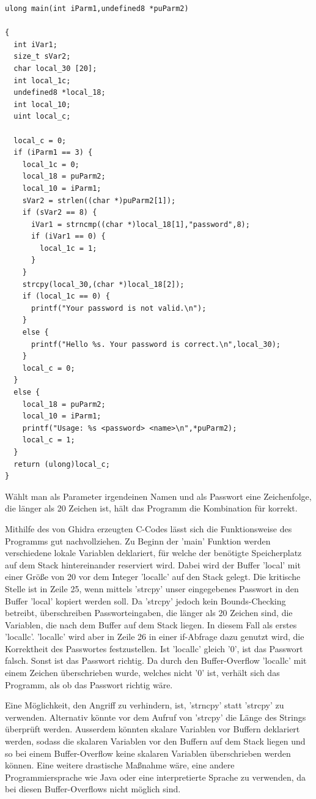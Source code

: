 \documentclass[12pt,a4paper]{article}
\begin{document}
\begin{lstlisting}[style=CStyle]
ulong main(int iParm1,undefined8 *puParm2)

{
  int iVar1;
  size_t sVar2;
  char local_30 [20];
  int local_1c;
  undefined8 *local_18;
  int local_10;
  uint local_c;
  
  local_c = 0;
  if (iParm1 == 3) {
    local_1c = 0;
    local_18 = puParm2;
    local_10 = iParm1;
    sVar2 = strlen((char *)puParm2[1]);
    if (sVar2 == 8) {
      iVar1 = strncmp((char *)local_18[1],"password",8);
      if (iVar1 == 0) {
        local_1c = 1;
      }
    }
    strcpy(local_30,(char *)local_18[2]);
    if (local_1c == 0) {
      printf("Your password is not valid.\n");
    }
    else {
      printf("Hello %s. Your password is correct.\n",local_30);
    }
    local_c = 0;
  }
  else {
    local_18 = puParm2;
    local_10 = iParm1;
    printf("Usage: %s <password> <name>\n",*puParm2);
    local_c = 1;
  }
  return (ulong)local_c;
}
\end{lstlisting}
\bigskip

Wählt man als Parameter irgendeinen Namen und als Passwort eine Zeichenfolge, die länger als 20
Zeichen ist, hält das Programm die Kombination für korrekt.
\bigskip

Mithilfe des von Ghidra erzeugten C-Codes lässt sich die Funktionsweise des Programms gut nachvollziehen.
Zu Beginn der 'main' Funktion werden verschiedene lokale Variablen deklariert, für welche 
der benötigte Speicherplatz auf dem Stack hintereinander reserviert wird.
Dabei wird der Buffer 'local' mit einer Größe von 20 vor dem Integer 'local\textunderscore lc' 
auf den Stack gelegt.
Die kritische Stelle ist in Zeile 25, wenn mittels 'strcpy' unser eingegebenes Passwort 
in den Buffer 'local' kopiert werden soll. Da 'strcpy' jedoch kein Bounds-Checking 
betreibt, überschreiben Passworteingaben, die länger als 20 Zeichen sind, die Variablen, 
die nach dem Buffer auf dem Stack liegen. In diesem Fall als erstes 'local\textunderscore lc'. 
'local\textunderscore lc' wird aber in Zeile 26 in einer if-Abfrage dazu genutzt wird, die Korrektheit 
des Passwortes festzustellen. 
Ist 'local\textunderscore lc' gleich '0', ist das Passwort falsch. Sonst ist das Passwort richtig. 
Da durch den Buffer-Overflow 'local\textunderscore lc' mit einem Zeichen überschrieben wurde, 
welches nicht '0' ist, verhält sich das Programm, als ob das Passwort richtig wäre.
\bigskip

Eine Möglichkeit, den Angriff zu verhindern, ist, 'strncpy' statt 'strcpy' zu verwenden.
Alternativ könnte vor dem Aufruf von 'strcpy' die Länge des Strings überprüft werden.
Ausserdem könnten skalare Variablen vor Buffern deklariert werden, sodass die skalaren 
Variablen vor den Buffern auf dem Stack liegen und so bei einem Buffer-Overflow keine 
skalaren Variablen überschrieben werden können. 
Eine weitere drastische Maßnahme wäre, eine andere Programmiersprache wie Java oder eine 
interpretierte Sprache zu verwenden, da bei diesen Buffer-Overflows nicht möglich sind.
\bigskip
\end{document}
